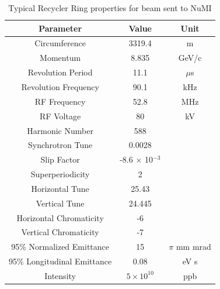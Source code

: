 \begin{table}[H]
\centering
\caption{Typical Recycler Ring properties for beam sent to NuMI}
\label{tab:rrparams}
\begin{tabular}{@{}ccc@{}}
\toprule
\textbf{Parameter}          & \textbf{Value}                             & \textbf{Unit} \\ \midrule
Circumference               & 3319.4                                     & m             \\
Momentum                    & 8.835                                      & GeV/c         \\
Revolution Period           & 11.1                                       & $\mu$s        \\
Revolution Frequency        & 90.1                                       & kHz        \\
RF Frequency                & 52.8                                       & MHz           \\
RF Voltage                  & 80                                         & kV            \\
Harmonic Number             & 588                                        &               \\
Synchrotron Tune            & 0.0028                                     &               \\
Slip Factor                 & -8.6 $\times$ 10$^{-3}$                    &               \\
Superperiodicity            & 2                                          &               \\
Horizontal Tune             & 25.43                                      &               \\
Vertical Tune               & 24.445                                     &               \\
Horizontal Chromaticity     & -6                                         &               \\
Vertical Chromaticity       & -7                                         &               \\
95\% Normalized Emittance   & 15                                         & $\pi$ mm mrad \\
95\% Longitudinal Emittance & 0.08                                       & eV s          \\
Intensity                   & $5\times10^{10}$                           & ppb           \\

\end{tabular}
\end{table}

